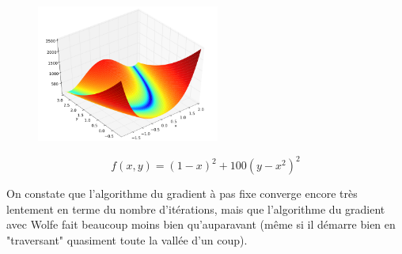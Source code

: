 \documentclass[a4paper,10pt]{article}
\begin{document}
\begin{figure}[H]
	\centering
	\includegraphics[width = 6cm]{img/rosenbrock.png}
\end{figure}

$$
f(x,y) = (1-x)^2 + 100(y-x^2)^2
$$

\begin{figure}[H]
	\centering
\end{figure}

On constate que l'algorithme du gradient à pas fixe converge encore très lentement en terme du nombre d'itérations, mais que l'algorithme du gradient avec Wolfe fait beaucoup moins bien qu'auparavant (même si il démarre bien en "traversant" quasiment toute la vallée d'un coup).
\end{document}

